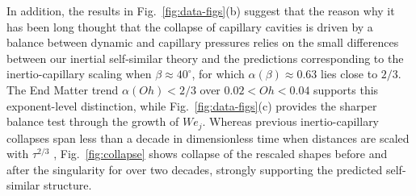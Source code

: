 \documentclass[twocolumn]{revtex4-2}
\begin{document}
In addition, the results in Fig.~\ref{fig:data-figs}(b) suggest that the reason why it has been long thought that the collapse of capillary cavities is driven by a balance between dynamic and capillary pressures relies on the small differences between our inertial self-similar theory and the predictions corresponding to the inertio-capillary scaling when $\beta\approx 40^\circ$, for which $\alpha(\beta)\approx0.63$ lies close to $2/3$.
The End Matter trend $\alpha(Oh)<2/3$ over $0.02<Oh<0.04$ supports this exponent-level distinction, while Fig.~\ref{fig:data-figs}(c) provides the sharper balance test through the growth of $We_j$. Whereas previous inertio-capillary collapses span less than a decade in dimensionless time when distances are scaled with $\tau^{2/3}$ \cite{Zeff,PRLEggers,PRLCattaneo}, Fig.~\ref{fig:collapse} shows collapse of the rescaled shapes before and after the singularity for over two decades, strongly supporting the predicted self-similar structure.
\end{document}
